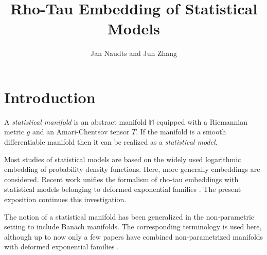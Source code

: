 \documentclass[graybox]{svmult}
\newcommand{\Mo}{\mathbb M}
\begin{document}
\title*{Rho-Tau Embedding of Statistical Models} 
 
\author{Jan Naudts and Jun Zhang}

\maketitle  





\section{Introduction}
\label{sect:intro}

A {\em statistical manifold} \cite{lauritzen1987a,amarinagaoka2000,AyJLS2017}
is an abstract manifold $\Mo$ equipped with a Riemannian metric $g$ and an
Amari-Chentsov tensor $T$. If the manifold is a smooth differentiable manifold
then it can be realized \cite{LeHV2005} as a {\em statistical model}.

Most studies of statistical models are based on the widely used logarithmic embedding of
probability density functions. Here, more generally embeddings are considered.
Recent work \cite{ZN17,NZ17,NZ18} unifies the formalism of rho-tau embeddings \cite{zhang2004a}
with statistical models belonging to deformed exponential families \cite{NJ04}.
The present exposition continues this investigation.  

The notion of a statistical manifold has been generalized in the non-parametric 
setting \cite{pistonesempi1995,pistonerogantin1999}
to include Banach manifolds. The corresponding terminology is used here, although up to now
only a few papers have combined non-parametrized manifolds with deformed exponential families
\cite{pistone2009,NNJ12,VigCav2013,MP17}.
\end{document}
